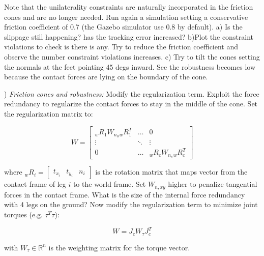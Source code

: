 \documentclass{report}
\newcommand{\Rnum}{\mathbb{R}} %
\newcommand{\mat}[1]{\ensuremath{\begin{bmatrix}#1\end{bmatrix}}}	%
\begin{document}
Note that the unilaterality constraints are naturally incorporated in the friction cones and are no longer needed.
Run again a simulation setting a conservative friction coefficient of 0.7 (the Gazebo simulator use 0.8 by default).
a) Is the slippage still happening? has the tracking error increased?
b)Plot the constraint violations to check is there is any. Try to reduce the friction coefficient and observe 
the number constraint violations increases. 
c) Try to tilt the cones setting the normals at the feet pointing 45 degs inward. 
See the robustness becomes low because the contact forces are lying on the boundary of the cone. 

\quad

) \textit{Friction cones and robustness:}
Modify the regularization term. Exploit the force redundancy to regularize the contact forces to stay in the middle of the cone. 
Set the regularization matrix to:

\begin{equation}
W = \mat{ {}_wR_1 W_{n_0} {}_wR_1^T &  \dots & 0 \\ \vdots & \ddots & \vdots \\ 0 & \dots &    {}_wR_c W_{n_c} {}_wR_c^T }
\end{equation}

%
where ${}_wR_i=\mat{t_{x_i} & t_{y_i} & n_i}$ is the rotation matrix that maps vector from the contact frame of leg $i$ to the world frame.
Set $W_{n,xy}$  higher to penalize tangential forces in the contact frame.
What is the size of the internal force redundancy with 4 legs on the ground? 
Now modify the regularization term to minimize joint torques (e.g. $\tau^T\tau$):

\begin{equation}
W = J_c W_{\tau}  J_c^T
\end{equation}

with $W_\tau \in \Rnum^n$ is the weighting matrix for the torque vector.
\end{document}
